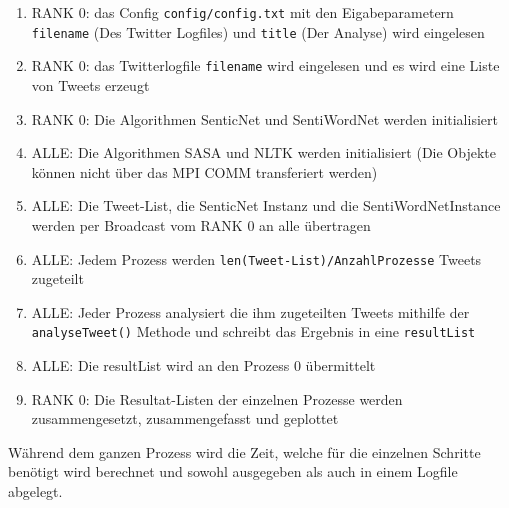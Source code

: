 \begin{enumerate} 
\item RANK 0: das Config \lstinline$config/config.txt$ mit den Eigabeparametern \lstinline$filename$ (Des Twitter Logfiles) und \lstinline$title$ (Der Analyse) wird eingelesen
\item RANK 0: das Twitterlogfile \lstinline$filename$ wird eingelesen und es wird eine Liste von Tweets erzeugt
\item RANK 0: Die Algorithmen SenticNet und SentiWordNet werden initialisiert
\item ALLE: Die Algorithmen SASA und NLTK werden initialisiert (Die Objekte können nicht über das MPI COMM transferiert werden)
\item ALLE: Die Tweet-List, die SenticNet Instanz und die SentiWordNetInstance werden per Broadcast vom RANK 0 an alle übertragen
\item ALLE: Jedem Prozess werden \lstinline$len(Tweet-List)/AnzahlProzesse$ Tweets zugeteilt
\item ALLE: Jeder Prozess analysiert die ihm zugeteilten Tweets mithilfe der \lstinline$analyseTweet()$ Methode und schreibt das Ergebnis in eine \lstinline$resultList$
\item ALLE: Die resultList wird an den Prozess 0 übermittelt
\item RANK 0: Die Resultat-Listen der einzelnen Prozesse werden zusammengesetzt, zusammengefasst und geplottet 
\end{enumerate}

Während dem ganzen Prozess wird die Zeit, welche für die einzelnen Schritte benötigt wird berechnet und sowohl ausgegeben als auch in einem Logfile abgelegt.


